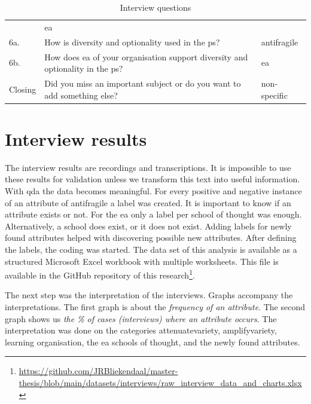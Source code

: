 \begin{table}[H]
{\begin{tabular}{@{}p{}p{}p{}@{}}
			& \acrshort{ea} \\%
			6a. & How is \gls{diversity} and \gls{optionality} used in the \gls{ps}? & \Gls{antifragile} \\%
			6b. & How does \acrshort{ea} of your organisation support \gls{diversity} and \gls{optionality} in the \gls{ps}? & \acrshort{ea} \\%
			Closing & Did you miss an important subject or do you want to add something else? & non-specific \\%
			\bottomrule
		\end{tabular}
	}%
		\caption[Interview questions]{Interview questions}
		\label{tab:interviewquestions}
\end{table}
\section{Interview results}
The interview results are recordings and transcriptions. It is impossible to use these results for validation unless we transform this text into useful information. With \acrfull{qda} the data becomes meaningful. For every positive and negative instance of an \gls{attribute} of \gls{antifragile} a label was created. It is important to know if an \gls{attribute} exists or not. For the \acrshort{ea} only a label per school of thought was enough. Alternatively, a school does exist, or it does not exist. Adding labels for newly found attributes helped with discovering possible new attributes. After defining the labels, the coding was started. The data set of this analysis is available as a structured Microsoft Excel workbook with multiple worksheets. This file is available in the GitHub repository of this research\footnote{\url{https://github.com/JRBliekendaal/master-thesis/blob/main/datasets/interviews/raw_interview_data_and_charts.xlsx}}.  

The next step was the interpretation of the interviews. Graphs accompany the interpretations. The first graph is about the \textit{frequency of an \gls{attribute}}. The second graph shows us \textit{the \% of cases (interviews) where an attribute occurs}. The interpretation was done on the categories \gls{attenuatevariety}, \gls{amplifyvariety}, learning organisation, the \acrlong{ea} schools of thought, and the newly found \glspl{attribute}.
